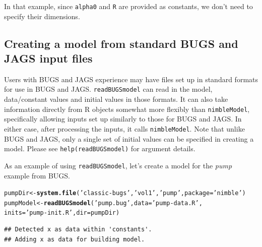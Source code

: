 \documentclass[12pt,oneside]{book}\usepackage[]{graphicx}\usepackage[]{color}
\makeatletter
\newcommand{\hlstr}[1]{\textcolor[rgb]{0.192,0.494,0.8}{#1}}%
\newcommand{\hlstd}[1]{\textcolor[rgb]{0.345,0.345,0.345}{#1}}%
\newcommand{\hlkwb}[1]{\textcolor[rgb]{0.69,0.353,0.396}{#1}}%
\newcommand{\hlkwc}[1]{\textcolor[rgb]{0.333,0.667,0.333}{#1}}%
\newcommand{\hlkwd}[1]{\textcolor[rgb]{0.737,0.353,0.396}{\textbf{#1}}}%
\newenvironment{kframe}{%
 \def\at@end@of@kframe{}%
 \ifinner\ifhmode%
  \def\at@end@of@kframe{\end{minipage}}%
  \begin{minipage}{\columnwidth}%
 \fi\fi%
 \def\FrameCommand##1{\hskip\@totalleftmargin \hskip-\fboxsep
 \colorbox{shadecolor}{##1}\hskip-\fboxsep
     \hskip-\linewidth \hskip-\@totalleftmargin \hskip\columnwidth}%
 \MakeFramed {\advance\hsize-\width
   \@totalleftmargin\z@ \linewidth\hsize
   \@setminipage}}%
 {\par\unskip\endMakeFramed%
 \at@end@of@kframe}
\newenvironment{knitrout}{}{} %
\def\cd#1{\texttt{#1}}
\def\nm#1{\textit{#1}}
\makeatother
\begin{document}
In that example, since \cd{alpha0} and \cd{R} are provided as constants, we don't need to specify their dimensions.

\subsection{Creating a model from standard BUGS and JAGS input files}
\label{sec:readBUGSmodel}

Users with BUGS and JAGS experience may have files set up in standard
formats for use in BUGS and JAGS.  \cd{readBUGSmodel} can
read in the model, data/constant values and initial values in those
formats. It can also take information directly from R objects
somewhat more flexibly than \cd{nimbleModel}, specifically allowing
inputs set up similarly to those for BUGS and JAGS.
In either case, after processing the inputs, it calls \cd{nimbleModel}.
Note that unlike BUGS and JAGS, only a single set of initial values can be
specified in creating a model. Please see \cd{help(readBUGSmodel)} for argument details.  

As an example of using \cd{readBUGSmodel}, let's create a model for the \nm{pump} example from BUGS.
\begin{knitrout}
\color{fgcolor}\begin{kframe}
\begin{alltt}
\hlstd{pumpDir} \hlkwb{<-} \hlkwd{system.file}\hlstd{(}\hlstr{'classic-bugs'}\hlstd{,} \hlstr{'vol1'}\hlstd{,} \hlstr{'pump'}\hlstd{,} \hlkwc{package} \hlstd{=} \hlstr{'nimble'}\hlstd{)}
\hlstd{pumpModel} \hlkwb{<-} \hlkwd{readBUGSmodel}\hlstd{(}\hlstr{'pump.bug'}\hlstd{,} \hlkwc{data} \hlstd{=} \hlstr{'pump-data.R'}\hlstd{,}
                           \hlkwc{inits} \hlstd{=} \hlstr{'pump-init.R'}\hlstd{,} \hlkwc{dir} \hlstd{= pumpDir)}
\end{alltt}
\begin{verbatim}
## Detected x as data within 'constants'.
## Adding x as data for building model.
\end{verbatim}
\end{kframe}
\end{knitrout}
\end{document}
